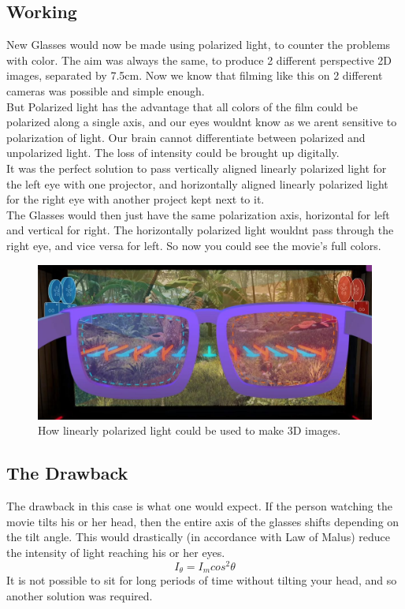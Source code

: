 \documentclass[11pt]{article}
\begin{document}
\subsection{Working}

New Glasses would now be made using polarized light, to counter the problems with color. The aim was always the same, to produce 2 different perspective 2D images, separated by 7.5cm. Now we know that filming like this on 2 different cameras was possible and simple enough.\\

But Polarized light has the advantage that all colors of the film could be polarized along a single axis, and our eyes wouldnt know as we arent sensitive to polarization of light. Our brain cannot differentiate between polarized and unpolarized light. The loss of intensity could be brought up digitally. \\

It was the perfect solution to pass vertically aligned linearly polarized light for the left eye with one projector, and horizontally aligned linearly polarized light for the right eye with another project kept next to it.\\

The Glasses would then just have the same polarization axis, horizontal for left and vertical for right. The horizontally polarized light wouldnt pass through the right eye, and vice versa for left. So now you could see the movie's full colors. 

\begin{figure}[H]
	\centering
	\includegraphics[scale=.37]{method 2.jpg}
	\caption{How linearly polarized light could be used to make 3D images.}
	\label{fig:This figure}
\end{figure}

\subsection{The Drawback}
The drawback in this case is what one would expect. If the person watching the movie tilts his or her head, then the entire axis of the glasses shifts depending on the tilt angle. This would drastically (in accordance with Law of Malus) reduce the intensity of light reaching his or her eyes.
\begin{equation}
 I_\theta = I_m cos^2\theta
\end{equation}
It is not possible to sit for long periods of time without tilting your head, and so another solution was required. 
\end{document}

